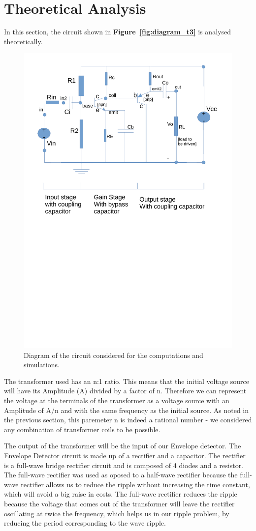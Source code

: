 \section{Theoretical Analysis}
\label{sec:analysis}

In this section, the circuit shown in \textbf{Figure~\ref{fig:diagram_t3}} is analysed
theoretically.
\begin{figure}[H] \centering
\includegraphics[width=0.5\linewidth]{diagram_t4.pdf}
\vspace{-6cm}
\caption{Diagram of the circuit considered for the computations and simulations.}
\label{fig:diagram_t4}
\end{figure}

The transformer used has an n:1 ratio. This means that the initial voltage source will have its Amplitude (A) divided by a factor of n. Therefore we can represent the voltage at the terminals of the transformer as a voltage source with an Amplitude of A/n and with the same frequency as the initial source. As noted in the previous section, this paremeter n is indeed a rational number - we considered any combination of transformer coils to be possible.

The output of the transformer will be the input of our Envelope detector. The Envelope Detector circuit is made up of a rectifier and a capacitor. The rectifier is a full-wave bridge rectifier circuit and is composed of 4 diodes and a resistor. The full-wave rectifier was used as oposed to a half-wave rectifier because the full-wave rectifier allows us to reduce the ripple without increasing the time constant, which will avoid a big raise in costs. The full-wave rectifier reduces the ripple because the voltage that comes out of the transformer will leave the rectifier oscillating at twice the frequency, which helps us in our ripple problem, by reducing the period corresponding to the wave ripple.

